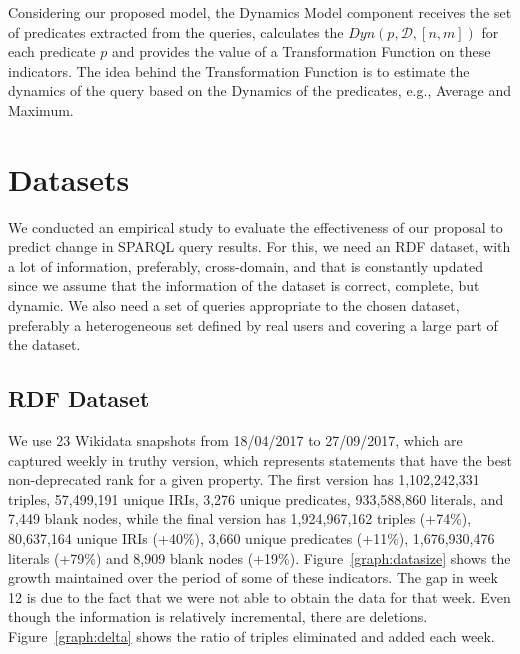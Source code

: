 \documentclass[runningheads]{llncs}
\begin{document}
Considering our proposed model, the Dynamics Model component receives the set of predicates extracted from the queries, calculates the $Dyn(p, \mathcal{D},[n,m])$ for each predicate $p$ and provides the value of a Transformation Function on these indicators. The idea behind the Transformation Function is to estimate the dynamics of the query based on the Dynamics of the predicates, e.g., Average and Maximum.


\section{Datasets}
\label{sec:data}

We conducted an empirical study to evaluate the effectiveness of our proposal to predict change in SPARQL query results. For this, we need an RDF dataset, with a lot of information, preferably, cross-domain, and that is constantly updated since we assume that the information of the dataset is correct, complete, but dynamic. We also need a set of queries appropriate to the chosen dataset, preferably a heterogeneous set defined by real users and covering a large part of the dataset.

\subsection{RDF Dataset}

We use 23 Wikidata snapshots from 18/04/2017 to 27/09/2017, which are captured weekly in truthy version, which represents statements that have the best non-deprecated rank for a given property. 
The first version has 1,102,242,331 triples, 57,499,191 unique IRIs, 3,276 unique predicates, 933,588,860 literals, and 7,449 blank nodes, while the final version has 1,924,967,162 triples (+74\%), 80,637,164 unique IRIs (+40\%), 3,660 unique predicates (+11\%), 1,676,930,476 literals (+79\%) and 8,909 blank nodes (+19\%). Figure~\ref{graph:datasize} shows the growth maintained over the period of some of these indicators. The gap in week 12 is due to the fact that we were not able to obtain the data for that week. Even though the information is relatively incremental, there are deletions. Figure~\ref{graph:delta} shows the ratio of triples eliminated and added each week.
\end{document}
